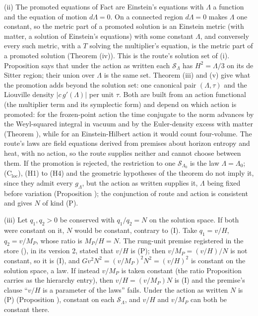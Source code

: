 (ii) The promoted equations of Fact  are Einstein's equations with $\Lambda$ a function and the equation of motion $d\Lambda = 0$. On a connected region $d\Lambda = 0$ makes $\Lambda$ one constant, so the metric part of a promoted solution is an Einstein metric (with matter, a solution of Einstein's equations) with some constant $\Lambda$, and conversely every such metric, with a $T$ solving the multiplier's equation, is the metric part of a promoted solution (Theorem (iv)). This is the route's solution set of (i). Proposition  says that under the action as written each $\mathcal{S}_{\Lambda}$ has $H^{2} = \Lambda/3$ on its de Sitter region; their union over $\Lambda$ is the same set. Theorem (iii) and (v) give what the promotion adds beyond the solution set: one canonical pair $(\Lambda, \tau)$ and the Liouville density $|c\,g'(\Lambda)|$ per unit $\tau$. Both are built from an action functional (the multiplier term and its symplectic form) and depend on which action is promoted: for the frozen-point action the time conjugate to the norm advances by the Weyl-squared integral in vacuum and by the Euler-density excess with matter (Theorem ), while for an Einstein-Hilbert action it would count four-volume. The route's laws are field equations derived from premises about horizon entropy and heat, with no action, so the route supplies neither and cannot choose between them. If the promotion is rejected, the restriction to one $\mathcal{S}_{\Lambda_{0}}$ is the law $\Lambda = \Lambda_{0}$; (C$_{\mathrm{loc}}$), (H1) to (H4) and the geometric hypotheses of the theorem do not imply it, since they admit every $g_{\Lambda}$, but the action as written supplies it, $\Lambda$ being fixed before variation (Proposition ); the conjunction of route and action is consistent and gives $N$ of kind (P).

(iii) Let $q_{1}, q_{2} > 0$ be conserved with $q_{1}/q_{2} = N$ on the solution space. If both were constant on it, $N$ would be constant, contrary to (I). Take $q_{1} = v/H$, $q_{2} = v/M_{P}$, whose ratio is $M_{P}/H = N$. The rung-unit premise registered in the store (), in its version 2, stated that $v/H$ is (P); then $v/M_{P} = (v/H)/N$ is not constant, so it is (I), and $G v^{2}N^{2} = (v/M_{P})^{2}N^{2} = (v/H)^{2}$ is constant on the solution space, a law. If instead $v/M_{P}$ is taken constant (the ratio Proposition  carries as the hierarchy entry), then $v/H = (v/M_{P})N$ is (I) and the premise's clause ``$v/H$ is a parameter of the laws'' fails. Under the action as written $N$ is (P) (Proposition ), constant on each $\mathcal{S}_{\Lambda}$, and $v/H$ and $v/M_{P}$ can both be constant there.


